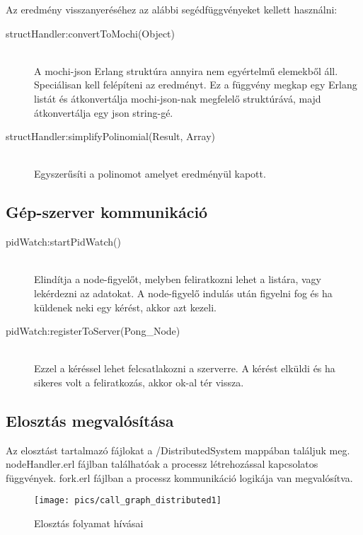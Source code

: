 	Az eredmény visszanyeréséhez az alábbi segédfüggvényeket kellett használni:
	\begin{description}
	
		\item[structHandler:convertToMochi(Object)] \hfill \\ 
		A mochi-json Erlang struktúra annyira nem egyértelmű elemekből áll. Speciálisan kell felépíteni az eredményt. Ez a függvény megkap egy Erlang listát és átkonvertálja mochi-json-nak megfelelő struktúrává, majd átkonvertálja egy json string-gé.

		\item[structHandler:simplifyPolinomial(Result, Array) ] \hfill \\ 
		Egyszerűsíti a polinomot amelyet eredményül kapott.
	
	\end{description}
\subsection{Gép-szerver kommunikáció}
	\begin{description}
	\item[pidWatch:startPidWatch()]
	\hfill \\ Elindítja a node-figyelőt, melyben feliratkozni lehet a listára, vagy lekérdezni az adatokat. A node-figyelő indulás után figyelni fog és ha küldenek neki egy kérést, akkor azt kezeli. 
	\item[pidWatch:registerToServer(Pong\_Node)]
	\hfill \\ Ezzel a kéréssel lehet felcsatlakozni a szerverre. A kérést elküldi és ha sikeres volt a feliratkozás, akkor ok-al tér vissza.
	\end{description}
\subsection{Elosztás megvalósítása}
	Az elosztást tartalmazó fájlokat a /DistributedSystem mappában találjuk meg. nodeHandler.erl fájlban találhatóak a processz létrehozással kapcsolatos függvények. fork.erl fájlban a processz kommunikáció logikája van megvalósítva.

	\begin{figure}[h]
		\texttt{[image: pics/call\_graph\_distributed1]}
		\centering
		\caption{Elosztás folyamat hívásai\label{fig:call_graph_distributed1}}
	\end{figure}

